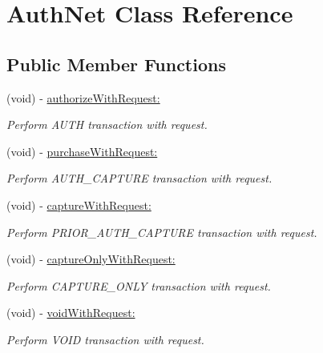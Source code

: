 \hypertarget{interface_auth_net}{
\section{AuthNet Class Reference}
\label{interface_auth_net}
}
\subsection*{Public Member Functions}
\begin{DoxyCompactItemize}
\item 
(void) -\/ \hyperlink{interface_auth_net_ae8435d36d1a6d00e6e771a9fa58ec210}{authorizeWithRequest:}
\begin{DoxyCompactList}\small\item\em Perform AUTH transaction with request. \item\end{DoxyCompactList}\item 
(void) -\/ \hyperlink{interface_auth_net_a466bfa76518d3dd27fc7eb38a7967812}{purchaseWithRequest:}
\begin{DoxyCompactList}\small\item\em Perform AUTH\_\-CAPTURE transaction with request. \item\end{DoxyCompactList}\item 
(void) -\/ \hyperlink{interface_auth_net_a6a586e0765c774199ccecbebdf072d3d}{captureWithRequest:}
\begin{DoxyCompactList}\small\item\em Perform PRIOR\_\-AUTH\_\-CAPTURE transaction with request. \item\end{DoxyCompactList}\item 
(void) -\/ \hyperlink{interface_auth_net_a5d2e5d9f91f57cf1ea72a8f091aebf2d}{captureOnlyWithRequest:}
\begin{DoxyCompactList}\small\item\em Perform CAPTURE\_\-ONLY transaction with request. \item\end{DoxyCompactList}\item 
(void) -\/ \hyperlink{interface_auth_net_aef8d13917d406c5056a2176817562260}{voidWithRequest:}
\begin{DoxyCompactList}\small\item\em Perform VOID transaction with request. \item\end{DoxyCompactList}\item 

\end{DoxyCompactItemize}
